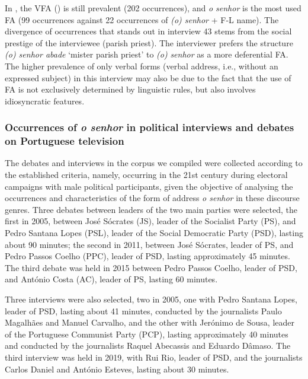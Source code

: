 \documentclass[output=paper]{langscibook}
\begin{document}
In , the VFA () is still prevalent (202 occurrences), and \textit{o senhor} is the most used FA (99 occurrences against 22 occurrences of \textit{(o) senhor} + F-L name). The divergence of occurrences that stands out in interview 43 stems from the social prestige of the interviewee (parish priest). The interviewer prefers the structure \textit{(o) senhor abade} ‘mister parish priest’ to \textit{(o)} \textit{senhor} as a more deferential FA. The higher prevalence of only verbal forms (verbal address, i.e.,  without an expressed subject) in this interview may also be due to the fact that the use of FA is not exclusively determined by linguistic rules, but also involves idiosyncratic features.



\subsubsection{Occurrences of \textit{o senhor} in political interviews and debates on Portuguese television}\label{sec:marques:4.2.2}\largerpage
The debates and interviews in the corpus we compiled were collected according to the established criteria, namely, occurring in the 21st century during electoral campaigns with male political participants, given the objective of analysing the occurrences and characteristics of the form of address \textit{o senhor} in these discourse genres. Three debates between leaders of the two main parties were selected, the first in 2005, between José Sócrates (JS), leader of the Socialist Party (PS), and Pedro Santana Lopes (PSL), leader of the Social Democratic Party (PSD), lasting about 90 minutes; the second in 2011, between José Sócrates, leader of PS, and Pedro Passos Coelho (PPC), leader of PSD, lasting approximately 45 minutes. The third debate was held in 2015 between Pedro Passos Coelho, leader of PSD, and António Costa (AC), leader of PS, lasting 60 minutes.



Three interviews were also selected, two in 2005, one with Pedro Santana Lopes, leader of PSD, lasting about 41 minutes, conducted by the journalists Paulo Magalhães and Manuel Carvalho, and the other with Jerónimo de Sousa, leader of the Portuguese Communist Party (PCP), lasting approximately 40 minutes and conducted by the journalists Raquel Abecassis and Eduardo Dâmaso. The third interview was held in 2019, with Rui Rio, leader of PSD, and the journalists Carlos Daniel and António Esteves, lasting about 30 minutes.
\end{document}
